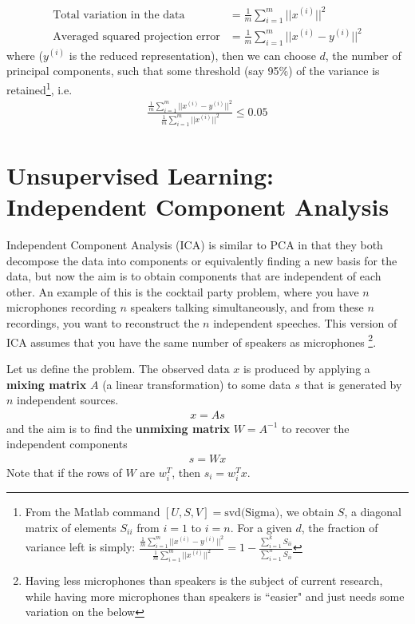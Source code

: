 \documentclass[letterpaper,10pt]{article}
\begin{document}
\begin{align}
\text{Total variation in the data}  &= \frac{1}{m} \sum_{i=1}^{m} \vert \vert x^{(i)} \vert \vert^2 \\
\text{Averaged squared projection error} &= \frac{1}{m} \sum_{i=1}^{m} \vert \vert x^{(i)} - y^{(i)} \vert \vert^2
\end{align}
where ($y^{(i)}$ is the reduced representation), then we can choose $d$, the number of principal components, such that some threshold (say 95\%) of the variance is retained\footnote{From the Matlab command $[U,S,V] = \text{svd(Sigma)}$, we obtain $S$, a diagonal matrix of elements $S_{ii}$ from $i=1$ to $i=n$. For a given $d$, the fraction of variance left is simply: $	\frac{\frac{1}{m} \sum_{i=1}^{m} \vert \vert x^{(i)} - y^{(i)} \vert \vert^2}{\frac{1}{m} \sum_{i=1}^{m} \vert \vert x^{(i)} \vert \vert^2} = 1 - \frac{\sum_{i=1}^{k} S_{ii} }{\sum_{i=1}^{n} S_{ii} }$
}, i.e.
\begin{align}
\frac{\frac{1}{m} \sum_{i=1}^{m} \vert \vert x^{(i)} - y^{(i)} \vert \vert^2}{\frac{1}{m} \sum_{i=1}^{m} \vert \vert x^{(i)} \vert \vert^2} \leq 0.05
\end{align}





\section{Unsupervised Learning: Independent Component Analysis}

Independent Component Analysis (ICA) is similar to PCA in that they both decompose the data into components or equivalently finding a new basis for the data, but now the aim is to obtain components that are independent of each other. An example of this is the cocktail party problem, where you have $n$ microphones recording $n$ speakers talking simultaneously, and from these $n$ recordings, you want to reconstruct the $n$ independent speeches. This version of ICA assumes that you have the same number of speakers as microphones \footnote{Having less microphones than speakers is the subject of current research, while having more microphones than speakers is ``easier" and just needs some variation on the below}.


Let us define the problem. The observed data $x$ is produced by applying a \textbf{mixing matrix} $A$ (a linear transformation) to some data $s$ that is generated by $n$ independent sources.
\begin{align}
x = As
\end{align}
and the aim is to find the \textbf{unmixing matrix} $W = A^{-1}$ to recover the independent components
\begin{align}
s = Wx
\end{align}
Note that if the rows of $W$ are $w_i^T$, then $s_i = w_i^T x$.
\end{document}
